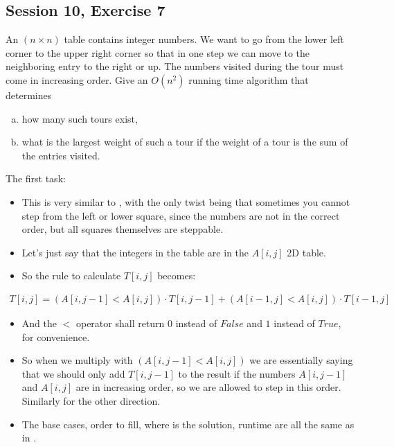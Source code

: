\subsection {Session 10, Exercise 7}


An $(n \times{} n)$ table contains integer numbers. We want to go from the lower left corner to the upper right corner so that in one step we can move to the neighboring entry to the right or up. The numbers visited during the tour must come in increasing order. Give an $O(n^2)$ running time algorithm that determines

\begin{enumerate}[a)]
\item how many such tours exist,
\item what is the largest weight of such a tour if the weight of a tour is the sum of the entries visited.
\end{enumerate}


The first task:

\begin{itemize}
    \item This is very similar to , with the only twist being that sometimes you cannot step from the left or lower square, since the numbers are not in the correct order, but all squares themselves are steppable.
    \item Let's just say that the integers in the table are in the $A[i,j]$ 2D table.
    \item So the rule to calculate $T[i,j]$ becomes:
\end{itemize}

\begin{align*}
T[i,j] = (A[i, j-1] < A[i,j]) \cdot{} T[i, j-1] + (A[i-1, j] < A[i,j]) \cdot{} T[i-1, j]
\end{align*}

\begin{itemize}
    \item And the $<$ operator shall return $0$ instead of $False$ and $1$ instead of $True$, for convenience.
    \item So when we multiply with $(A[i, j-1] < A[i,j])$ we are essentially saying that we should only add $T[i, j-1]$ to the result if the numbers $A[i, j-1]$ and $A[i,j]$ are in increasing order, so we are allowed to step in this order. Similarly for the other direction.
    \item The base cases, order to fill, where is the solution, runtime are all the same as in .
\end{itemize}


